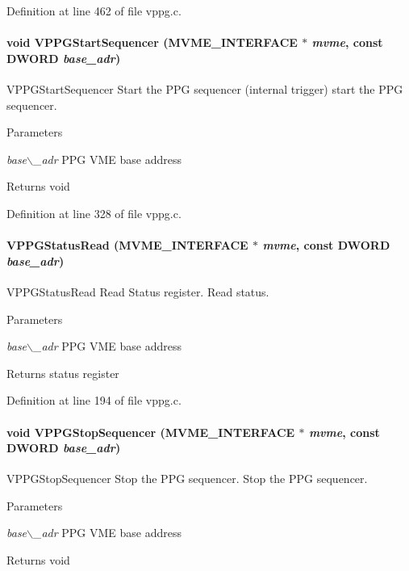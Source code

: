 Definition at line 462 of file vppg.c.
\paragraph[{VPPGStartSequencer}]{\setlength{\rightskip}{0pt plus 5cm}void VPPGStartSequencer ({\bf MVME\_\-INTERFACE} $\ast$ {\em mvme}, \/  const {\bf DWORD} {\em base\_\-adr})}\hfill\label{vppg_8c_aa631062dec5475b71398bf970501a81b}
VPPGStartSequencer Start the PPG sequencer (internal trigger)  start the PPG sequencer. 
\begin{DoxyParams}{Parameters}
\item[{\em base$\backslash$\_\-adr}]PPG VME base address \end{DoxyParams}
\begin{DoxyReturn}{Returns}
void 
\end{DoxyReturn}


Definition at line 328 of file vppg.c.
\paragraph[{VPPGStatusRead}]{ VPPGStatusRead ({\bf MVME\_\-INTERFACE} $\ast$ {\em mvme}, \/  const {\bf DWORD} {\em base\_\-adr})}\hfill\label{vppg_8c_a23fc7a80ad391f80fc10a97417519980}
VPPGStatusRead Read Status register.  Read status. 
\begin{DoxyParams}{Parameters}
\item[{\em base$\backslash$\_\-adr}]PPG VME base address \end{DoxyParams}
\begin{DoxyReturn}{Returns}
status register 
\end{DoxyReturn}


Definition at line 194 of file vppg.c.
\paragraph[{VPPGStopSequencer}]{\setlength{\rightskip}{0pt plus 5cm}void VPPGStopSequencer ({\bf MVME\_\-INTERFACE} $\ast$ {\em mvme}, \/  const {\bf DWORD} {\em base\_\-adr})}\hfill\label{vppg_8c_acabc3ac9c2749e8ad0d503643f3e48e3}
VPPGStopSequencer Stop the PPG sequencer.  Stop the PPG sequencer. 
\begin{DoxyParams}{Parameters}
\item[{\em base$\backslash$\_\-adr}]PPG VME base address \end{DoxyParams}
\begin{DoxyReturn}{Returns}
void 
\end{DoxyReturn}


